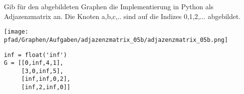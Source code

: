 ﻿\question[4]
Gib für den abgebildeten Graphen die Implementierung in Python als Adjazenzmatrix an.
Die Knoten a,b,c,.. sind auf die Indizes 0,1,2,... abgebildet.

\texttt{[image: \\pfad/Graphen/Aufgaben/adjazenzmatrix\_05b/adjazenzmatrix\_05b.png]}
\begin{solutionbox}{5cm}
\begin{lstlisting}
inf = float('inf')
G = [[0,inf,4,1],
     [3,0,inf,5],
     [inf,inf,0,2],
     [inf,2,inf,0]]
\end{lstlisting}
\end{solutionbox}
